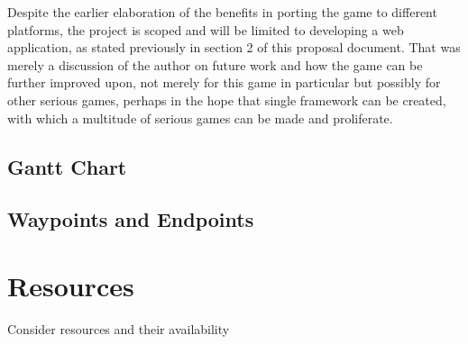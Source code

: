 \documentclass[a4paper]{article}
\begin{document}
Despite the earlier elaboration of the benefits in porting the game to different platforms, the project is scoped and will be limited to developing a web application, as stated previously in section 2 of this proposal document. That was merely a discussion of the author on future work and how the game can be further improved upon, not merely for this game in particular but possibly for other serious games, perhaps in the hope that single framework can be created, with which a multitude of serious games can be made and proliferate.

\subsection{Gantt Chart}
\subsection{Waypoints and Endpoints}

\section{Resources} %
Consider resources and their availability

\newpage
\printbibliography
\end{document}
